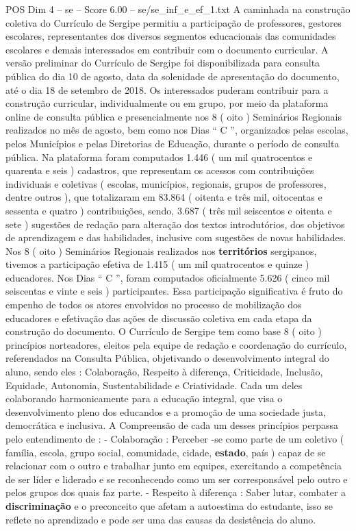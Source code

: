 \begin{textsample}{POS Dim 4 – se – Score 6.00 – se/se\_inf\_e\_ef\_1.txt}
A caminhada na construção coletiva do Currículo de Sergipe permitiu a participação de professores, gestores escolares, representantes dos diversos segmentos educacionais das comunidades escolares e demais interessados em contribuir com o documento curricular.
A versão preliminar do Currículo de Sergipe foi disponibilizada para consulta pública do dia 10 de agosto, data da solenidade de apresentação do documento, até o dia 18 de setembro de 2018.
Os interessados puderam contribuir para a construção curricular, individualmente ou em grupo, por meio da plataforma online de consulta pública e presencialmente nos 8 ( oito ) Seminários Regionais realizados no mês de agosto, bem como nos Dias “ C ”, organizados pelas escolas, pelos Municípios e pelas Diretorias de Educação, durante o período de consulta pública.
Na plataforma foram computados 1.446 ( um mil quatrocentos e quarenta e seis ) cadastros, que representam os acessos com contribuições individuais e coletivas ( escolas, municípios, regionais, grupos de professores, dentre outros ), que totalizaram em 83.864 ( oitenta e três mil, oitocentas e sessenta e quatro ) contribuições, sendo, 3.687 ( três mil seiscentos e oitenta e sete ) sugestões de redação para alteração dos textos introdutórios, dos objetivos de aprendizagem e das habilidades, inclusive com sugestões de novas habilidades.
Nos 8 ( oito ) Seminários Regionais realizados nos \textbf{territórios} sergipanos, tivemos a participação efetiva de 1.415 ( um mil quatrocentos e quinze ) educadores.
Nos Dias “ C ”, foram computados oficialmente 5.626 ( cinco mil seiscentas e vinte e seis ) participantes.
Essa participação significativa é fruto do empenho de todos os atores envolvidos no processo de mobilização dos educadores e efetivação das ações de discussão coletiva em cada etapa da construção do documento.
O Currículo de Sergipe tem como base 8 ( oito ) princípios norteadores, eleitos pela equipe de redação e coordenação do currículo, referendados na Consulta Pública, objetivando o desenvolvimento integral do aluno, sendo eles : Colaboração, Respeito à diferença, Criticidade, Inclusão, Equidade, Autonomia, Sustentabilidade e Criatividade.
Cada um deles colaborando harmonicamente para a educação integral, que visa o desenvolvimento pleno dos educandos e a promoção de uma sociedade justa, democrática e inclusiva.
A Compreensão de cada um desses princípios perpassa pelo entendimento de : - Colaboração : Perceber -se como parte de um coletivo ( família, escola, grupo social, comunidade, cidade, \textbf{estado}, país ) capaz de se relacionar com o outro e trabalhar junto em equipes, exercitando a competência de ser líder e liderado e se reconhecendo como um ser corresponsável pelo outro e pelos grupos dos quais faz parte. - Respeito à diferença : Saber lutar, combater a \textbf{discriminação} e o preconceito que afetam a autoestima do estudante, isso se reflete no aprendizado e pode ser uma das causas da desistência do aluno.

\end{textsample}

